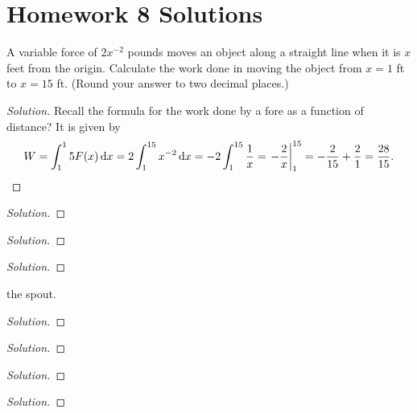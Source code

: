 \chapter{Homework 8 Solutions}
\begin{problem}[WebAssign, HW8, 1]
  A variable force of $2x^{-2}$ pounds moves an object along a straight
  line when it is $x$ feet from the origin. Calculate the work done in
  moving the object from $x=1$ ft to $x=15$ ft. (Round your answer to two
  decimal places.)
\end{problem}
\begin{proof}[Solution]
Recall the formula for the work done by a fore as a function of distance?
It is given by
\[
W=\int_1^15 F(x)\,\mathrm{d} x=
2\int_1^{15} x^{-2}\,\mathrm{d} x=
-2\int_1^{15}\frac{1}{x}
=\left.-\frac{2}{x}\right|_1^{15}=
-\frac{2}{15}+\frac{2}{1}=\frac{28}{15}.
\]
\end{proof}
\begin{problem}[WebAssign, HW8, 2]
\end{problem}
\begin{proof}[Solution]
\end{proof}
\begin{problem}[WebAssign, HW8, 3]

\end{problem}
\begin{proof}[Solution]
\end{proof}
\begin{problem}[WebAssign, HW8, 4]
\end{problem}
\begin{proof}[Solution]
\end{proof}
\begin{problem}[WebAssign, HW8, 5]
the spout.
\end{problem}
\begin{proof}[Solution]
\end{proof}
\begin{problem}[WebAssign, HW8, 6]
\end{problem}
\begin{proof}[Solution]
\end{proof}
\begin{problem}[WebAssign, HW8, 7]
\end{problem}
\begin{proof}[Solution]
\end{proof}
\begin{problem}[WebAssign, HW8, 8]
\end{problem}
\begin{proof}[Solution]
\end{proof}

